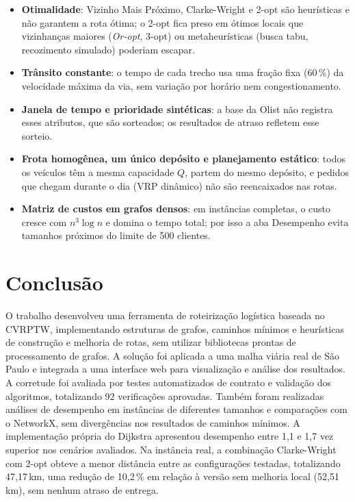 \documentclass[12pt]{article}
\begin{document}
\begin{itemize}
  \item \textbf{Otimalidade}: Vizinho Mais Próximo, Clarke-Wright e 2-opt são
        heurísticas e não garantem a rota ótima; o 2-opt fica preso em ótimos locais
        que vizinhanças maiores (\textit{Or-opt}, 3-opt) ou metaheurísticas (busca tabu,
        recozimento simulado) poderiam escapar.
  \item \textbf{Trânsito constante}: o tempo de cada trecho usa uma fração fixa (60\,\%)
        da velocidade máxima da via, sem variação por horário nem congestionamento.
  \item \textbf{Janela de tempo e prioridade sintéticas}: a base da Olist não registra
        esses atributos, que são sorteados; os resultados de atraso refletem esse sorteio.
  \item \textbf{Frota homogênea, um único depósito e planejamento estático}: todos os
        veículos têm a mesma capacidade $Q$, partem do mesmo depósito, e pedidos que
        chegam durante o dia (VRP dinâmico) não são reencaixados nas rotas.
  \item \textbf{Matriz de custos em grafos densos}: em instâncias completas, o custo
        cresce com $n^3\log n$ e domina o tempo total; por isso a aba Desempenho evita
        tamanhos próximos do limite de 500 clientes.
\end{itemize}

\section{Conclusão}\label{sec:conclusao}

O trabalho desenvolveu uma ferramenta de roteirização logística baseada no CVRPTW,
implementando estruturas de grafos, caminhos mínimos e heurísticas de construção e
melhoria de rotas, sem utilizar bibliotecas prontas de processamento de grafos. A
solução foi aplicada a uma malha viária real de São Paulo e integrada a uma interface
web para visualização e análise dos resultados. A corretude foi avaliada por testes
automatizados de contrato e validação dos algoritmos, totalizando 92 verificações
aprovadas. Também foram realizadas análises de desempenho em instâncias de diferentes
tamanhos e comparações com o NetworkX, sem divergências nos resultados de caminhos
mínimos. A implementação própria do Dijkstra apresentou desempenho entre 1,1 e 1,7 vez
superior nos cenários avaliados. Na instância real, a combinação Clarke-Wright com
2-opt obteve a menor distância entre as configurações testadas, totalizando 47,17\,km,
uma redução de 10,2\,\% em relação à versão sem melhoria local (52,51\,km), sem nenhum
atraso de entrega.
\end{document}
